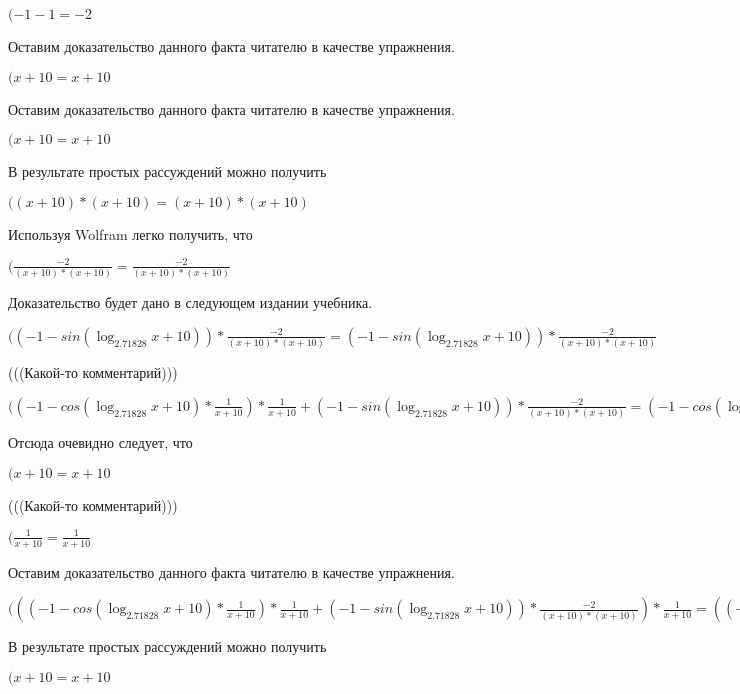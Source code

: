 \documentclass[12pt,a4paper,fleqn]{article}
\theoremstyle{definition}
\begin{document}
$( -1  -  1  =  -2 $

Оставим доказательство данного факта читателю в качестве упражнения.

$( x  +  10  =  x  +  10 $

Оставим доказательство данного факта читателю в качестве упражнения.

$( x  +  10  =  x  +  10 $

В результате простых рассуждений можно получить

$(( x  +  10 ) * ( x  +  10 ) = ( x  +  10 ) * ( x  +  10 )$

Используя Wolfram легко получить, что

$(\frac{ -2 }{( x  +  10 ) * ( x  +  10 )}
 = \frac{ -2 }{( x  +  10 ) * ( x  +  10 )}
$

Доказательство будет дано в следующем издании учебника.

$(( -1  - sin(\log_{ 2.71828 }{ x  +  10 })) * \frac{ -2 }{( x  +  10 ) * ( x  +  10 )}
 = ( -1  - sin(\log_{ 2.71828 }{ x  +  10 })) * \frac{ -2 }{( x  +  10 ) * ( x  +  10 )}
$

(((Какой-то комментарий)))

$(( -1  - cos(\log_{ 2.71828 }{ x  +  10 }) * \frac{ 1 }{ x  +  10 }
) * \frac{ 1 }{ x  +  10 }
 + ( -1  - sin(\log_{ 2.71828 }{ x  +  10 })) * \frac{ -2 }{( x  +  10 ) * ( x  +  10 )}
 = ( -1  - cos(\log_{ 2.71828 }{ x  +  10 }) * \frac{ 1 }{ x  +  10 }
) * \frac{ 1 }{ x  +  10 }
 + ( -1  - sin(\log_{ 2.71828 }{ x  +  10 })) * \frac{ -2 }{( x  +  10 ) * ( x  +  10 )}
$

Отсюда очевидно следует, что

$( x  +  10  =  x  +  10 $

(((Какой-то комментарий)))

$(\frac{ 1 }{ x  +  10 }
 = \frac{ 1 }{ x  +  10 }
$

Оставим доказательство данного факта читателю в качестве упражнения.

$((( -1  - cos(\log_{ 2.71828 }{ x  +  10 }) * \frac{ 1 }{ x  +  10 }
) * \frac{ 1 }{ x  +  10 }
 + ( -1  - sin(\log_{ 2.71828 }{ x  +  10 })) * \frac{ -2 }{( x  +  10 ) * ( x  +  10 )}
) * \frac{ 1 }{ x  +  10 }
 = (( -1  - cos(\log_{ 2.71828 }{ x  +  10 }) * \frac{ 1 }{ x  +  10 }
) * \frac{ 1 }{ x  +  10 }
 + ( -1  - sin(\log_{ 2.71828 }{ x  +  10 })) * \frac{ -2 }{( x  +  10 ) * ( x  +  10 )}
) * \frac{ 1 }{ x  +  10 }
$

В результате простых рассуждений можно получить

$( x  +  10  =  x  +  10 $
\end{document}
